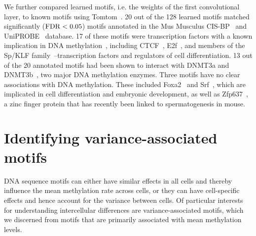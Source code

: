 We further compared learned motifs, i.e. the weights of the first convolutional layer, to known motifs using Tomtom~\citep{bailey_meme_2009}. 20 out of the 128 learned motifs matched significantly ($\operatorname{FDR}<0.05$) motifs annotated in the Mus Musculus CIS-BP~\citep{weirauch_determination_2014} and UniPROBE~\citep{newburger_uniprobe:_2009} database. 17 of these motifs were transcription factors with a known implication in DNA methylation~\citep{hervouet_dnmt3/transcription_2009,luu_disclosing_2013,whitaker_predicting_2015}, including CTCF~\citep{kim_analysis_2007}, E2f~\citep{tsai_mouse_2008}, and members of the Sp/KLF family~\citep{fernandez-zapico_functional_2011}--transcription factors and regulators of cell differentiation. 13 out of the 20 annotated motifs had been shown to interact with DNMT3a and DNMT3b~\citep{hervouet_dnmt3/transcription_2009}, two major DNA methylation enzymes. Three motifs have no clear associations with DNA methylation. These included Foxa2~\citep{lee_foxa2_2005,wan_compensatory_2005} and Srf~\citep{arsenian_serum_1998,marais_srf_1993}, which are implicated in cell differentiation and embryonic development, as well as Zfp637~\citep{huang_il-6_2016,quenneville_embryonic_2011}, a zinc finger protein that has recently been linked to spermatogenesis in mouse.


\section{Identifying variance-associated motifs}

DNA sequence motifs can either have similar effects in all cells and thereby influence the mean methylation rate across cells, or they can have cell-specific effects and hence account for the variance between cells. Of particular interests for understanding intercellular differences are variance-associated motifs, which we discerned from motifs that are primarily associated with mean methylation levels.

